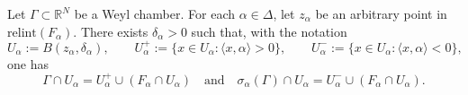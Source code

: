 \documentclass[12pt]{amsart}
\begin{document}
\begin{lemma}\label{lem:local_structure_near_facet}
Let $\Gamma\subset \mathbb{R}^N$ be a Weyl chamber.
For each $\alpha\in\Delta$, let $z_\alpha$ be an arbitrary point in $ \mathrm{relint}(F_\alpha)$.
There exists $\delta_\alpha>0$ such that, with the notation
\[
U_\alpha:=B(z_\alpha,\delta_\alpha),\qquad
U_\alpha^+:=\{x\in U_\alpha:\langle x,\alpha\rangle>0\},\qquad
U_\alpha^-:=\{x\in U_\alpha:\langle x,\alpha\rangle<0\},
\]
one has
\begin{equation}\label{Gammaequa}
\Gamma\cap U_\alpha=U_\alpha^+\cup (F_\alpha\cap U_\alpha)
\quad\text{and}\quad
\sigma_\alpha(\Gamma)\cap U_\alpha=U_\alpha^-\cup (F_\alpha\cap U_\alpha).
\end{equation}
\end{lemma}
\end{document}
